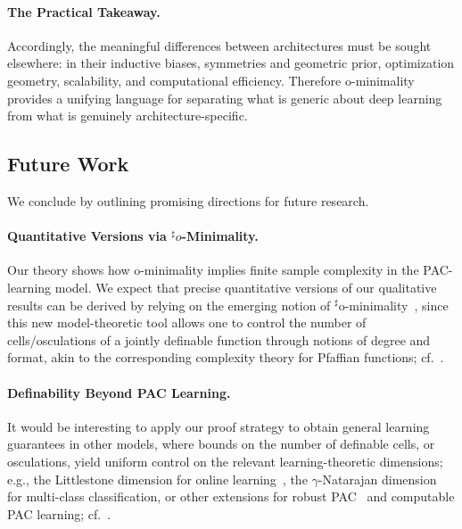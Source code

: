 \documentclass{article}
\theoremstyle{plain}
\theoremstyle{definition}
\theoremstyle{remark}
\theoremstyle{plain}
\numberwithin{thm}{section}
\theoremstyle{definition}
\numberwithin{equation}{section}
\begin{document}
\paragraph{The Practical Takeaway.}
Accordingly, the meaningful differences between architectures must be sought elsewhere: in their inductive biases, symmetries and geometric prior, optimization geometry, scalability, and computational efficiency. Therefore o-minimality provides a unifying language for separating what is generic about deep learning from what is genuinely architecture-specific.

\subsection{Future Work}
\label{appendix:Future Work}
We conclude by outlining promising directions for future research.

\paragraph{Quantitative Versions via $^{\sharp}o$-Minimality.}
Our theory shows how o-minimality implies finite sample complexity in the PAC-learning model.  We expect that precise quantitative versions of our qualitative results can be derived by relying on the emerging notion of $^{\sharp}$o-minimality~\cite{BinyaminiNovikov2023Tameness,BinyaminiNovikovZak2024Wilkie,BinyaminiNovikovZak2026Sharply}, since this new model-theoretic tool allows one to control the number of cells/osculations of a jointly definable function through notions of degree and format, akin to the corresponding complexity theory for Pfaffian functions; cf.~\cite{Khovanskii_Fewnomials}.

\paragraph{Definability Beyond PAC Learning.}
It would be interesting to apply our proof strategy to obtain general learning guarantees in other models, where bounds on the number of definable cells, or osculations, yield uniform control on the relevant learning-theoretic dimensions; e.g., the Littlestone dimension for online learning~\cite{Littlestone1988LearningQuickly}, the $\gamma$-Natarajan dimension~\cite{simon1997bounds} for multi-class classification, or other extensions for robust PAC~\cite{gourdeau2021hardness} and computable PAC learning; cf.~\cite{agarwal2021open,delle2023find}.


\end{document}
